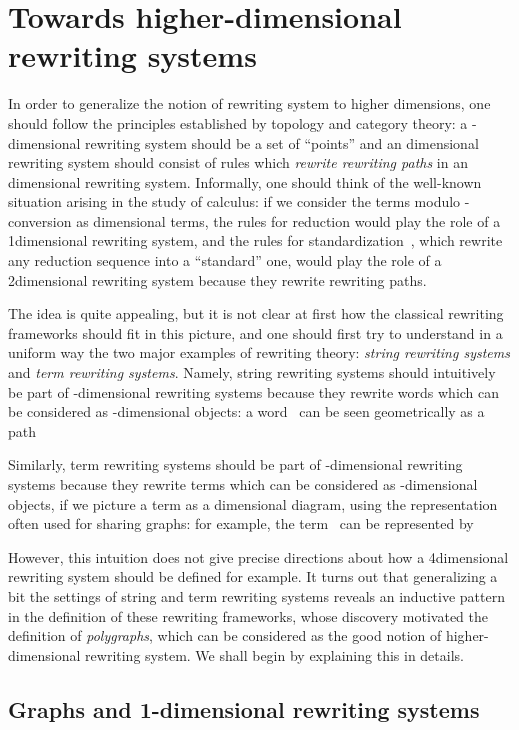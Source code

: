 \documentclass{LMCS}
\begin{document}
\section{Towards higher-dimensional rewriting systems}
\label{sec:hdrs}
In order to generalize the notion of rewriting system to higher dimensions, one
should follow the principles established by topology and category theory: a
-dimensional rewriting system should be a set of ``points'' and an
\nbd{}dimensional rewriting system should consist of rules which
\emph{rewrite rewriting paths} in an \nbd{}dimensional rewriting
system. Informally, one should think of the well-known situation arising in the
study of \nbd{}calculus: if we consider the \nbd{}terms modulo
-conversion as \nbd{}dimensional terms, the rules for
\nbd{}reduction would play the role of a 1\nbd{}dimensional rewriting
system, and the rules for standardization~\cite{mellies:ast}, which rewrite any
reduction sequence into a ``standard'' one, would play the role of a 2\nbd{}dimensional
rewriting system because they rewrite rewriting paths.

The idea is quite appealing, but it is not clear at first how the classical
rewriting frameworks should fit in this picture, and one should first try to
understand in a uniform way the two major examples of rewriting theory:
\emph{string rewriting systems} and \emph{term rewriting systems}. Namely,
string rewriting systems should intuitively be part of -dimensional rewriting
systems because they rewrite words which can be considered as -dimensional
objects: a word~ can be seen geometrically as a path

Similarly, term rewriting systems should be part of -dimensional rewriting
systems because they rewrite terms which can be considered as -dimensional
objects, if we picture a term as a \nbd{}dimensional diagram, using the
representation often used for sharing graphs: for example, the
term~ can be represented by

However, this intuition does not give precise directions about how a
4\nbd{}dimensional rewriting system should be defined for example. It turns out
that generalizing a bit the settings of string and term rewriting systems
reveals an inductive pattern in the definition of these rewriting frameworks,
whose discovery motivated the definition of \emph{polygraphs}, which can be
considered as the good notion of higher-dimensional rewriting system. We shall
begin by explaining this in details.

\subsection{Graphs and 1-dimensional rewriting systems}
\end{document}
